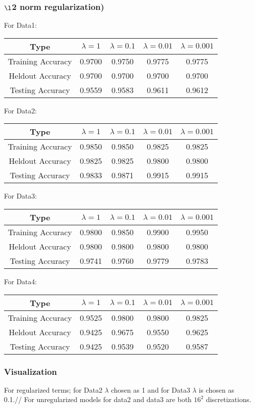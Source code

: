 \documentclass[letter,11pt]{article}
\begin{document}
	\subsubsection{$\l$2 norm regularization)}
	For Data1:		
		\begin{center}
			\begin{tabular}{|c| c |c |c | c |} 
				\hline
				Type & $\lambda = 1$ &  $\lambda = 0.1$  &  $\lambda = 0.01$  &  $\lambda = 0.001$ \\ [0.5ex] 
				\hline
				Training Accuracy & 0.9700 & 0.9750 & 0.9775 & 0.9775 \\ 
				\hline
				Heldout Accuracy & 0.9700 & 0.9700 & 0.9700 & 0.9700 \\
				\hline
				Testing Accuracy & 0.9559 & 0.9583 & 0.9611 & 0.9612 \\
				\hline
			\end{tabular}
		\end{center}
	For Data2:		
	\begin{center}
		\begin{tabular}{|c| c |c |c | c |} 
			\hline
			Type & $\lambda = 1$ &  $\lambda = 0.1$  &  $\lambda = 0.01$  &  $\lambda = 0.001$ \\ [0.5ex] 
			\hline
			Training Accuracy & 0.9850 & 0.9850 & 0.9825 & 0.9825 \\ 
			\hline
			Heldout Accuracy & 0.9825 & 0.9825 & 0.9800 & 0.9800 \\
			\hline
			Testing Accuracy & 0.9833 & 0.9871 & 0.9915 & 0.9915 \\
			\hline
		\end{tabular}
	\end{center}
	For Data3:		
	\begin{center}
		\begin{tabular}{|c| c |c |c | c |} 
			\hline
			Type & $\lambda = 1$ &  $\lambda = 0.1$  &  $\lambda = 0.01$  &  $\lambda = 0.001$ \\ [0.5ex] 
			\hline
			Training Accuracy & 0.9800 & 0.9850 & 0.9900 & 0.9950 \\ 
			\hline
			Heldout Accuracy & 0.9800 & 0.9800 & 0.9800 & 0.9800 \\
			\hline
			Testing Accuracy & 0.9741 & 0.9760 & 0.9779 & 0.9783 \\
			\hline
		\end{tabular}
	\end{center}
	For Data4:		
	\begin{center}
		\begin{tabular}{|c| c |c |c | c |} 
			\hline
			Type & $\lambda = 1$ &  $\lambda = 0.1$  &  $\lambda = 0.01$  &  $\lambda = 0.001$ \\ [0.5ex] 
			\hline
			Training Accuracy & 0.9525 & 0.9800 & 0.9800 & 0.9825 \\ 
			\hline
			Heldout Accuracy & 0.9425 & 0.9675 & 0.9550 & 0.9625 \\
			\hline
			Testing Accuracy & 0.9425 & 0.9539 & 0.9520 & 0.9587 \\
			\hline
		\end{tabular}
	\end{center}
	\subsubsection{Visualization}
		For regularized terms; for Data2  $\lambda$ chosen as 1 and for Data3 $\lambda$ is chosen as 0.1.//
		For unregularized models for data2 and data3 are both $16^2$ discretizations.
		
		 
								
\end{document}
